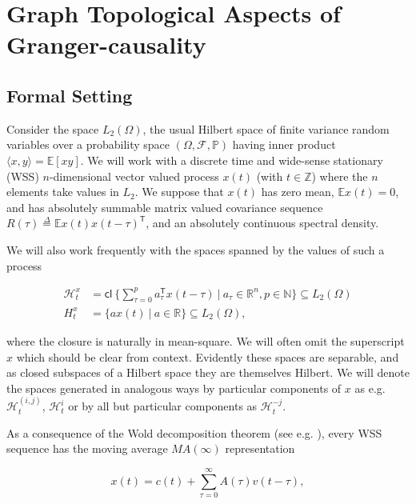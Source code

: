 \documentclass{statsoc}
\def\H{\mathcal{H}}  %
\def\cl{\mathsf{cl\ }}  %
\def\H{\mathcal{H}}  %
\def\E{\mathbb{E}}  %
\def\Z{\mathbb{Z}}  %
\def\R{\mathbb{R}}  %
\def\N{\mathbb{N}}  %
\def\T{\mathsf{T}}  %
\newcommand{\inner}[2]{\langle #1, #2 \rangle}  %
\begin{document}
\section{Graph Topological Aspects of Granger-causality}
\label{sec:theory}
\subsection{Formal Setting}
Consider the space $L_2(\Omega)$, the usual Hilbert space of finite
variance random variables over a probability space
$(\Omega, \mathcal{F}, \mathbb{P})$ having inner product
$\inner{x}{y} = \E[xy]$.  We will work with a discrete time and
wide-sense stationary (WSS) $n$-dimensional vector valued process
$x(t)$ (with $t \in \Z$) where the $n$ elements take values in $L_2$.
We suppose that $x(t)$ has zero mean, $\E x(t) = 0$, and has
absolutely summable matrix valued covariance sequence
$R(\tau) \overset{\Delta}{=} \E x(t)x(t - \tau)^\T$, and an absolutely continuous
spectral density.

We will also work frequently with the spaces spanned by the values of
such a process

\begin{equation}
  \label{eq:hilbert_space_defn}
  \begin{aligned}
    \H_t^x &= \cl \{\sum_{\tau = 0}^p a_\tau^\T x(t - \tau)\ |\ a_\tau \in \R^n, p \in \N\} \subseteq L_2(\Omega)\\
    H_t^x &= \{a x(t)\ |\ a \in \R\} \subseteq L_2(\Omega),
  \end{aligned}
\end{equation}

where the closure is naturally in mean-square.  We will often omit the
superscript $x$ which should be clear from context.  Evidently these
spaces are separable, and as closed subspaces of a Hilbert space they
are themselves Hilbert.  We will denote the spaces generated in
analogous ways by particular components of $x$ as e.g.
$\H_t^{(i, j)}$, $\H_t^{i}$ or by all but particular components as
$\H_t^{-j}$.

As a consequence of the Wold decomposition theorem (see e.g. \cite{lindquist}),
every WSS sequence has the moving average $MA(\infty)$
representation

\begin{equation}
\label{eqn:wold}
  x(t) = c(t) + \sum_{\tau = 0}^\infty A(\tau) v(t - \tau),
\end{equation}
\end{document}
